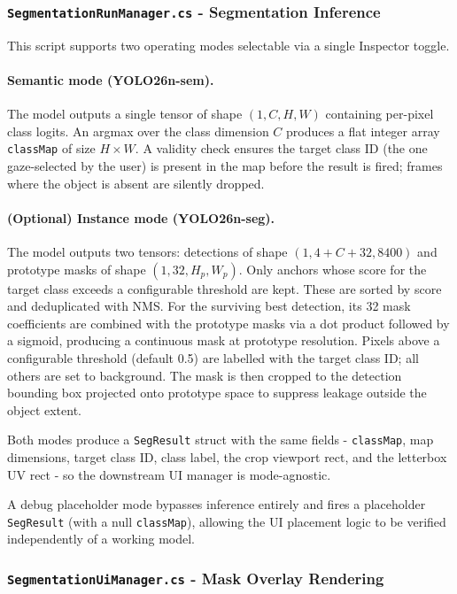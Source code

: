 \documentclass{article}
\begin{document}
\subsubsection{\texttt{SegmentationRunManager.cs} - Segmentation Inference}

This script supports two operating modes selectable via a single Inspector toggle.

\paragraph{Semantic mode (YOLO26n-sem).}
The model outputs a single tensor of shape $(1, C, H, W)$ containing per-pixel class logits. An argmax over the class dimension $C$ produces a flat integer array \texttt{classMap} of size $H \times W$. A validity check ensures the target class ID (the one gaze-selected by the user) is present in the map before the result is fired; frames where the object is absent are silently dropped.

\paragraph{(Optional) Instance mode (YOLO26n-seg).}
The model outputs two tensors: detections of shape $(1, 4 + C + 32, 8400)$ and prototype masks of shape $(1, 32, H_p, W_p)$. Only anchors whose score for the target class exceeds a configurable threshold are kept. These are sorted by score and deduplicated with NMS. For the surviving best detection, its 32 mask coefficients are combined with the prototype masks via a dot product followed by a sigmoid, producing a continuous mask at prototype resolution. Pixels above a configurable threshold (default 0.5) are labelled with the target class ID; all others are set to background. The mask is then cropped to the detection bounding box projected onto prototype space to suppress leakage outside the object extent.

Both modes produce a \texttt{SegResult} struct with the same fields - \texttt{classMap}, map dimensions, target class ID, class label, the crop viewport rect, and the letterbox UV rect - so the downstream UI manager is mode-agnostic.

A debug placeholder mode bypasses inference entirely and fires a placeholder \texttt{SegResult} (with a null \texttt{classMap}), allowing the UI placement logic to be verified independently of a working model.

\subsubsection{\texttt{SegmentationUiManager.cs} - Mask Overlay Rendering}
\end{document}
